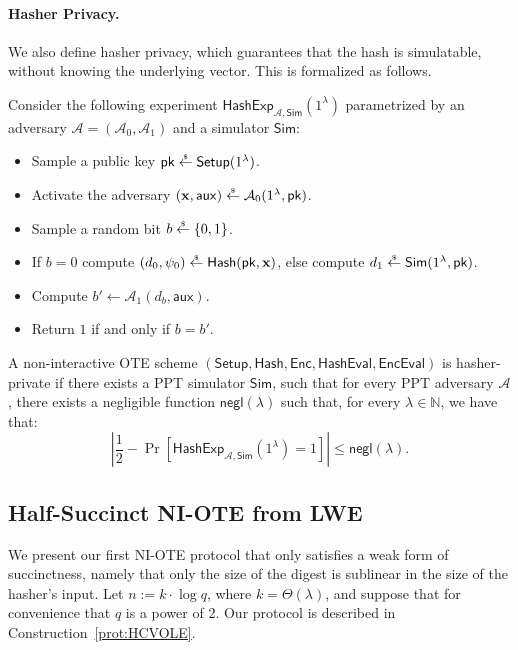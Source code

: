 \documentclass{theoretics}
\newcommand{\getsr}{\overset{\raisebox{-1pt}{$\scriptscriptstyle \$$}}{\gets}}
\newcommand{\sample}{\getsr}
\newcommand{\N}{\mathbb{N}}
\newcommand{\negl}{\mathsf{negl}}
\renewcommand{\sec}{\ensuremath{\lambda}}
\newcommand{\aux}{\mathsf{aux}}
\newcommand{\Sim}{\mathsf{Sim}}
\newcommand{\Adv}{\mathcal{A}}
\newcommand{\algofont}[1]{\ensuremath{\mathsf{#1}}}
\newcommand{\Enc}{{\algofont{Enc}}}
\newcommand{\Setup}{{\algofont{Setup}}}
\newcommand{\Eval}{\algofont{Eval}\xspace}
\newcommand{\Hash}{{\algofont{Hash}}}
\newcommand{\pk}{{\mathsf{pk}}}
\newcommand\bbbone{1}
\begin{document}
{
\paragraph{Hasher Privacy.} We also define hasher privacy, which guarantees that the hash is simulatable, without knowing the underlying vector. This is formalized as follows.}
{
\begin{definition}
Consider the following experiment $\mathsf{HashExp}_{\mathcal{A}, \Sim}(\bbbone^\sec)$ parametrized by an adversary $\mathcal{A} = (\mathcal{A}_0, \allowbreak \mathcal{A}_1)$ and a simulator $\Sim$:
\begin{itemize}
    \item Sample a public key $\pk\sample\Setup(\bbbone^\sec)$.
    \item Activate the adversary $(\mathbf{x}, \aux)\sample\Adv_0(\bbbone^\sec, \pk)$.
    \item Sample a random bit $b\sample\{0, 1\}$. 
    \item If $b = 0$ compute $(d_0, \psi_0)\sample\Hash(\pk, \mathbf{x})$, else compute 
    $d_1\sample\Sim(\bbbone^\sec, \pk)$.
    \item Compute $b' \gets \Adv_1(d_b, \aux)$.
    \item Return $1$ if and only if $b =b'$.
\end{itemize}
A non-interactive OTE scheme $(\Setup, \allowbreak \Hash, \allowbreak \Enc, \allowbreak \Hash\Eval, \allowbreak \Enc\Eval)$ is hasher-private if there exists a PPT simulator $\Sim$, such that for every PPT adversary $\mathcal{A}$, there exists a negligible function $\negl(\sec)$ such that, for every $\sec\in\N$, we have that:
\[
\left|\frac{1}{2} - \Pr\left[\mathsf{HashExp}_{\mathcal{A}, \Sim}(\bbbone^\sec) = 1\right] \right|\le\negl(\sec).
\]
\end{definition}}

\subsection{Half-Succinct NI-OTE from LWE}\label{sec:halfNIOTE}

We present our first NI-OTE protocol that only satisfies a weak form of succinctness, namely that only the size of the digest is sublinear in the size of the hasher's input. Let $n:= k\cdot \log q$, where $k=\Theta(\sec)$, and suppose that for convenience that $q$ is a power of $2$. Our protocol is described in Construction~\ref{prot:HCVOLE}.
\end{document}
